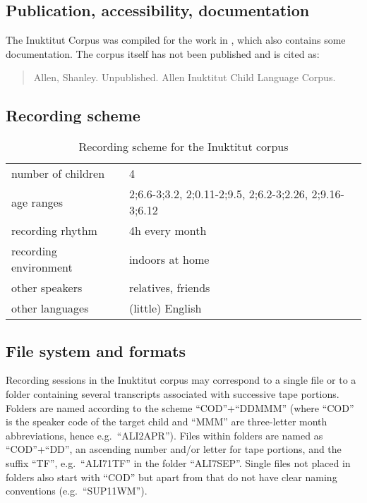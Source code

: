 \documentclass[a4paper, 11pt]{book}
\begin{document}
\subsection{Publication, accessibility, documentation}
The Inuktitut Corpus \citep{Allen2015a} was compiled for the work in \citet{Allen1996a}, which also contains some documentation. The corpus itself has not been published and is cited as: 

\begin{quote}
	Allen, Shanley. Unpublished. Allen Inuktitut Child Language Corpus.
\end{quote}

\subsection{Recording scheme}

\begin{table}[ht]
	\centering
	\begin{tabular}{ll}
		\toprule
		number of children 	& 4 \\
		age ranges 			& 2;6.6-3;3.2, 2;0.11-2;9.5, 2;6.2-3;2.26, 2;9.16-3;6.12 \\
		recording rhythm 	& 4h every month \\
		recording environment & indoors at home \\
		other speakers 		& relatives, friends \\
		other languages		& (little) English \\
		\bottomrule
	\end{tabular}
	\caption{Recording scheme for the Inuktitut corpus}
	\label{tab:Inuktitut recording scheme}
\end{table}

\subsection{File system and formats}

Recording sessions in the Inuktitut corpus may correspond to a single file or to a folder containing several transcripts associated with successive tape portions. Folders are named according to the scheme “COD”+“DDMMM” (where “COD” is the speaker code of the target child and “MMM” are three-letter month abbreviations, hence e.g.\ “ALI2APR”). Files within folders are named as “COD”+“DD”, an ascending number and/or letter for tape portions, and the suffix “TF”, e.g.\ “ALI71TF” in the folder “ALI7SEP”. Single files not placed in folders also start with “COD” but apart from that do not have clear naming conventions (e.g.\ “SUP11WM”). 
\end{document}
